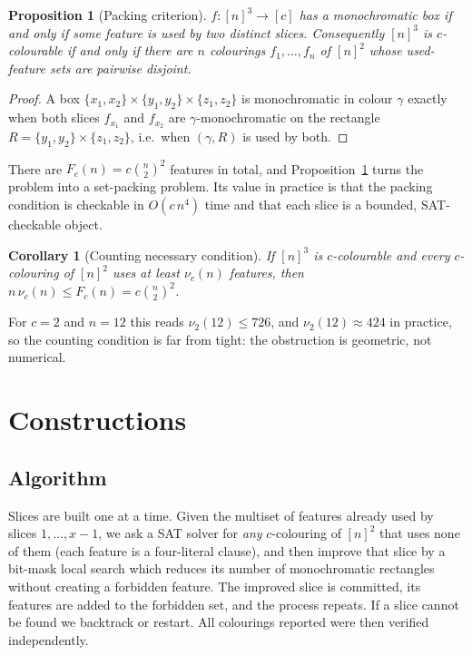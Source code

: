\documentclass[11pt]{article}
\newtheorem{proposition}[theorem]{Proposition}
\newtheorem{corollary}[theorem]{Corollary}
\theoremstyle{definition}
\begin{document}
\begin{proposition}[Packing criterion]\label{prop:packing}
$f\colon[n]^3\to[c]$ has a monochromatic box if and only if some feature is used by two
distinct slices. Consequently $[n]^3$ is $c$-colourable if and only if there are $n$
colourings $f_1,\dots,f_n$ of $[n]^2$ whose used-feature sets are pairwise disjoint.
\end{proposition}

\begin{proof}
A box $\{x_1,x_2\}\times\{y_1,y_2\}\times\{z_1,z_2\}$ is monochromatic in colour $\gamma$
exactly when both slices $f_{x_1}$ and $f_{x_2}$ are $\gamma$-monochromatic on the
rectangle $R=\{y_1,y_2\}\times\{z_1,z_2\}$, i.e.\ when $(\gamma,R)$ is used by both.
\end{proof}

There are $F_c(n)=c\binom{n}{2}^2$ features in total, and Proposition~\ref{prop:packing}
turns the problem into a set-packing problem. Its value in practice is that the packing
condition is checkable in $O(c\,n^4)$ time and that each slice is a bounded,
SAT-checkable object.

\begin{corollary}[Counting necessary condition]\label{cor:count}
If $[n]^3$ is $c$-colourable and every $c$-colouring of $[n]^2$ uses at least
$\nu_c(n)$ features, then $n\,\nu_c(n)\le F_c(n)=c\binom{n}{2}^2$.
\end{corollary}
For $c=2$ and $n=12$ this reads $\nu_2(12)\le 726$, and $\nu_2(12)\approx424$ in practice,
so the counting condition is far from tight: the obstruction is geometric, not numerical.

\section{Constructions}\label{sec:construct}

\subsection{Algorithm}
Slices are built one at a time. Given the multiset of features already used by slices
$1,\dots,x-1$, we ask a SAT solver for \emph{any} $c$-colouring of $[n]^2$ that uses none
of them (each feature is a four-literal clause), and then improve that slice by a
bit-mask local search which reduces its number of monochromatic rectangles without
creating a forbidden feature. The improved slice is committed, its features are added to
the forbidden set, and the process repeats. If a slice cannot be found we backtrack or
restart. All colourings reported were then verified independently.
\end{document}
